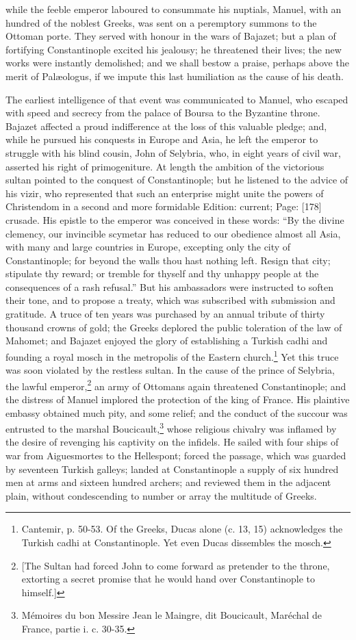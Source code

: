 while the feeble emperor laboured to consummate his nuptials, Manuel, with an hundred of the noblest Greeks, was sent on a peremptory summons to the Ottoman porte. They served with honour in the wars of Bajazet; but a plan of fortifying Constantinople excited his jealousy; he threatened their lives; the new works were instantly demolished; and we shall bestow a praise, perhaps above the merit of Palæologus, if we impute this last humiliation as the cause of his death.

The earliest intelligence of that event was communicated to Manuel, who escaped with speed and secrecy from the palace of Boursa to the Byzantine throne. Bajazet affected a proud indifference at the loss of this valuable pledge; and, while he pursued his conquests in Europe and Asia, he left the emperor to struggle with his blind cousin, John of Selybria, who, in eight years of civil war, asserted his right of primogeniture. At length the ambition of the victorious sultan pointed to the conquest of Constantinople; but he listened to the advice of his vizir, who represented that such an enterprise might unite the powers of Christendom in a second and more formidable Edition: current; Page: [178] crusade. His epistle to the emperor was conceived in these words: \texthebrew{“}By the divine clemency, our invincible scymetar has reduced to our obedience almost all Asia, with many and large countries in Europe, excepting only the city of Constantinople; for beyond the walls thou hast nothing left. Resign that city; stipulate thy reward; or tremble for thyself and thy unhappy people at the consequences of a rash refusal.\texthebrew{}” But his ambassadors were instructed to soften their tone, and to propose a treaty, which was subscribed with submission and gratitude. A truce of ten years was purchased by an annual tribute of thirty thousand crowns of gold; the Greeks deplored the public toleration of the law of Mahomet; and Bajazet enjoyed the glory of establishing a Turkish cadhi and founding a royal mosch in the metropolis of the Eastern church.\footnote{Cantemir, p. 50-53. Of the Greeks, Ducas alone (c. 13, 15) acknowledges the Turkish cadhi at Constantinople. Yet even Ducas dissembles the mosch.} Yet this truce was soon violated by the restless sultan. In the cause of the prince of Selybria, the lawful emperor,\footnote{[The Sultan had forced John to come forward as pretender to the throne, extorting a secret promise that he would hand over Constantinople to himself.]} an army of Ottomans again threatened Constantinople; and the distress of Manuel implored the protection of the king of France. His plaintive embassy obtained much pity, and some relief; and the conduct of the succour was entrusted to the marshal Boucicault,\footnote{Mémoires du bon Messire Jean le Maingre, dit Boucicault, Maréchal de France, partie i. c. 30-35.} whose religious chivalry was inflamed by the desire of revenging his captivity on the infidels. He sailed with four ships of war from Aiguesmortes to the Hellespont; forced the passage, which was guarded by seventeen Turkish galleys; landed at Constantinople a supply of six hundred men at arms and sixteen hundred archers; and reviewed them in the adjacent plain, without condescending to number or array the multitude of Greeks. 